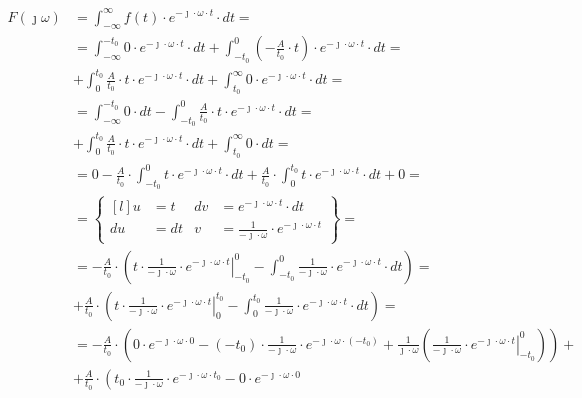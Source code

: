 \begin{task}
\begin{align*}
F(\jmath \omega )&=\int_{-\infty }^{\infty}f(t) \cdot e^{-\jmath \cdot \omega \cdot t}\cdot dt=\\
&=\int_{-\infty}^{-t_{0}} 0 \cdot e^{-\jmath \cdot \omega \cdot t}\cdot dt %
+\int_{-t_{0}}^{0} \left(-\frac{A}{t_{0}} \cdot t\right) \cdot e^{-\jmath \cdot \omega \cdot t}\cdot dt=\\
&+\int_{0}^{t_{0}} \frac{A}{t_{0}} \cdot t \cdot e^{-\jmath \cdot \omega \cdot t}\cdot dt
+\int_{t_{0}}^{\infty} 0 \cdot e^{-\jmath \cdot \omega \cdot t}\cdot dt=\\
&=\int_{-\infty}^{-t_{0}} 0 \cdot dt -\int_{-t_{0}}^{0}\frac{A}{t_{0}} \cdot t \cdot e^{-\jmath \cdot \omega \cdot t}\cdot dt =\\%
&+\int_{0}^{t_{0}} \frac{A}{t_{0}} \cdot t \cdot e^{-\jmath \cdot \omega \cdot t}\cdot dt 
+ \int_{t_{0}}^{\infty} 0 \cdot dt=\\
&= 0  - \frac{A}{t_{0}} \cdot \int_{-t_{0}}^{0} t \cdot e^{-\jmath \cdot \omega \cdot t}\cdot dt +\frac{A}{t_{0}} \cdot \int_{0}^{t_{0}} t \cdot e^{-\jmath \cdot \omega \cdot t}\cdot dt + 0=\\%
&=\begin{Bmatrix*}[l] %
u&=t & dv&=e^{ -\jmath \cdot \omega \cdot t} \cdot dt \\
du&=dt & v&=\frac{1}{-\jmath \cdot \omega}\cdot e^{ -\jmath \cdot \omega \cdot t}
\end{Bmatrix*}=\\
&=-\frac{A}{t_{0}}\cdot \left( \left. t \cdot \frac{1}{-\jmath \cdot \omega}\cdot e^{ -\jmath \cdot \omega \cdot t} \right|_{-t_{0}}^{0} %
- \int_{-t_{0}}^{0} \frac{1}{-\jmath \cdot \omega}\cdot e^{ -\jmath \cdot \omega \cdot t} \cdot dt \right)=\\
&+\frac{A}{t_{0}}\cdot \left( \left. t \cdot \frac{1}{-\jmath \cdot \omega}\cdot e^{ -\jmath \cdot \omega \cdot t} \right|_{0}^{t_{0}}
- \int_{0}^{t_{0}} \frac{1}{-\jmath \cdot \omega}\cdot e^{ -\jmath \cdot \omega \cdot t} \cdot dt \right)=\\
&=-\frac{A}{t_{0}}\cdot \left( 0 \cdot e^{-\jmath \cdot \omega \cdot 0} - (-t_{0}) \cdot \frac{1}{-\jmath \cdot \omega}\cdot e^{ -\jmath \cdot \omega \cdot (-t_{0})} %
+ \frac{1}{\jmath \cdot \omega} \left( \left. \frac{1}{-\jmath \cdot \omega}\cdot e^{ -\jmath \cdot \omega \cdot t} \right|_{-t_{0}}^{0}\right)\right)+\\
&+\frac{A}{t_{0}}\cdot \left(t_{0} \cdot \frac{1}{-\jmath \cdot \omega}\cdot e^{ -\jmath \cdot \omega \cdot t_{0}} - 0 \cdot e^{-\jmath \cdot \omega \cdot 0} 

\end{align*}
\end{task}
